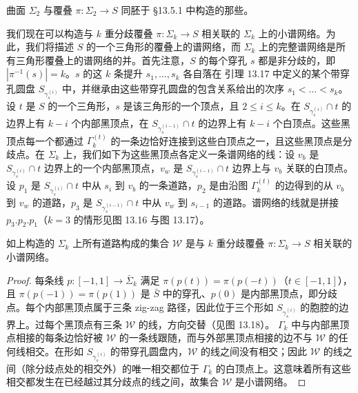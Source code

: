 
\begin{remark}[13.19]
曲面 $\Sigma_2$ 与覆叠 $\pi\colon\Sigma_2\to S$ 同胚于 §13.5.1 中构造的那些。
\end{remark}


我们现在可以构造与 $k$ 重分歧覆叠 $\pi\colon\Sigma_k\to S$ 相关联的 $\Sigma_k$ 上的小谱网络。为此，我们将描述 $S$ 的一个三角形的覆叠上的谱网络，而 $\Sigma_k$ 上的完整谱网络是所有三角形覆叠上的谱网络的并。首先注意，$S$ 的每个穿孔 $s$ 都是非分歧的，即 $|\pi^{-1}(s)|=k$。$s$ 的这 $k$ 条提升 $s_1,\dots,s_k$ 各自落在
引理 13.17 中定义的某个带穿孔圆盘 $S_{\gamma_s^{(i)}}$ 中，并继承由这些带穿孔圆盘的包含关系给出的次序 $s_1<\dots<s_k$。设 $t$ 是 $S$ 的一个三角形，$s$ 是该三角形的一个顶点，且 $2\le i\le k$。在 $S_{\gamma_s^{(i)}}\cap t$ 的边界上有 $k-i$ 个内部黑顶点，在 $S_{\gamma_s^{(i-1)}}\cap t$ 的边界上有 $k-i$ 个白顶点。这些黑顶点每一个都通过 $\Gamma_k^{(t)}$ 的一条边恰好连接到这些白顶点之一，且这些黑顶点是分歧点。在 $\Sigma_k$ 上，我们如下为这些黑顶点各定义一条谱网络的线：设 $v_b$ 是 $S_{\gamma_s^{(i)}}\cap t$ 边界上的一个内部黑顶点，$v_w$ 是 $S_{\gamma_s^{(i-1)}}\cap t$ 边界上与 $v_b$ 关联的白顶点。设 $p_1$ 是 $S_{\gamma_s^{(i)}}\cap t$ 中从 $s_i$ 到 $v_b$ 的一条道路，$p_2$ 是由沿图 $\Gamma_k^{(t)}$ 的边得到的从 $v_b$ 到 $v_w$ 的道路，$p_3$ 是 $S_{\gamma_s^{(i-1)}}\cap t$ 中从 $v_w$ 到 $s_{i-1}$ 的道路。谱网络的线就是拼接 $p_3.p_2.p_1$（$k=3$ 的情形见图 13.16 与图 13.17）。

\begin{proposition}[13.20]
如上构造的 $\Sigma_k$ 上所有道路构成的集合 $\mathcal{W}$ 是与 $k$ 重分歧覆叠 $\pi\colon\Sigma_k\to S$ 相关联的小谱网络。
\end{proposition}


\begin{proof}
每条线 $p\colon[-1,1]\to\bar\Sigma_k$ 满足 $\pi(p(t))=\pi(p(-t))$（$t\in[-1,1]$），且 $\pi(p(-1))=\pi(p(1))$ 是 $\bar S$ 中的穿孔、$p(0)$ 是内部黑顶点，即分歧点。每个内部黑顶点属于三条 zig-zag 路径，因此位于三个形如 $S_{\gamma_s^{(i)}}$ 的胞腔的边界上。过每个黑顶点有三条 $\mathcal{W}$ 的线，方向交替（见图 13.18）。
$\Gamma_k$ 中与内部黑顶点相接的每条边恰好被 $\mathcal{W}$ 的一条线跟随，而与外部黑顶点相接的边不与 $\mathcal{W}$ 的任何线相交。在形如 $S_{\gamma_s^{(i)}}$ 的带穿孔圆盘内，$\mathcal{W}$ 的线之间没有相交；因此 $\mathcal{W}$ 的线之间（除分歧点处的相交外）的唯一相交都位于 $\Gamma_k$ 的白顶点上。这意味着所有这些相交都发生在已经越过其分歧点的线之间，故集合 $\mathcal{W}$ 是小谱网络。
\end{proof}

